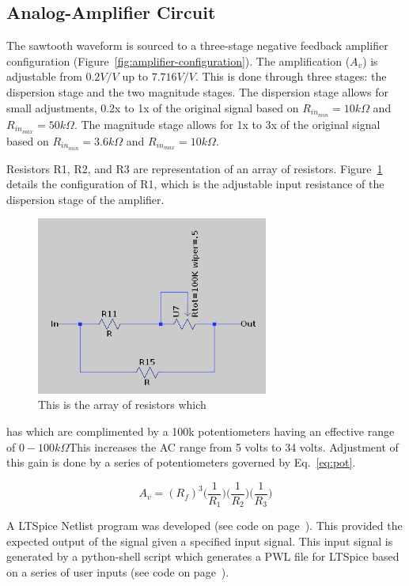 \documentclass[12pt,journal]{IEEEtran}
\begin{document}
\subsection{Analog-Amplifier Circuit}

The sawtooth waveform is sourced to a three-stage negative feedback amplifier configuration (Figure~\ref{fig:amplifier-configuration}). The amplification ($A_v$) is adjustable from $0.2 V/V$ up to $7.716 V/V$. This is done through three stages: the dispersion stage and the two magnitude stages. The dispersion stage allows for small adjustments, 0.2x to 1x of the original signal based on $R_{in_{min}} = 10k\Omega$ and $R_{in_{max}} = 50k\Omega$. The magnitude stage allows for 1x to 3x of the original signal based on  $R_{in_{min}} = 3.6k\Omega$ and $R_{in_{max}} = 10k\Omega$. 

Resistors R1, R2, and R3 are representation of an array of resistors. Figure~\ref{fig:r1-array} details the configuration of R1, which is the adjustable input resistance of the dispersion stage of the amplifier.

\begin{figure}[h!]
  \centering
	\includegraphics[width=3in]{./ltspice/adjustable-resistor-array.png}
	\caption[Cavity Mounts]{This is the array of resistors which}
	\label{fig:r1-array}
\end{figure}

has  which are complimented by a 100k potentiometers having an effective range of $0-100k\Omega$This increases the AC range from 5 volts to 34 volts. Adjustment of this gain is done by a series of potentiometers governed by Eq.~\ref{eq:pot}.

\begin{equation}
A_v = (R_f)^3\Big(\frac{1}{R_1}\Big)\Big(\frac{1}{R_2}\Big)\Big(\frac{1}{R_3}\Big)
\label{eq:pot}
\end{equation}

A LTSpice Netlist program was developed (see code on page~\pageref{code:ltspice-driver}). This provided the expected output of the signal given a specified input signal. This input signal is generated by a python-shell script which generates a PWL file for LTSpice based on a series of user inputs (see code on page~\pageref{code:pwl-ltspice-python}).
\end{document}
